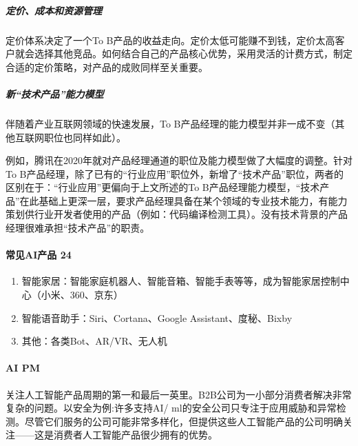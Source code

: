 \documentclass[letterpaper,11pt,english]{sphinxmanual}
\begin{document}
\subparagraph{定价、成本和资源管理}
\label{\detokenize{chapter_introduction/2B:id37}}
定价体系决定了一个To
B产品的收益走向。定价太低可能赚不到钱，定价太高客户就会选择其他竞品。如何结合自己的产品核心优势，采用灵活的计费方式，制定合适的定价策略，对产品的成败同样至关重要。


\subparagraph{新“技术产品”能力模型}
\label{\detokenize{chapter_introduction/2B:id38}}
伴随着产业互联网领域的快速发展，To
B产品经理的能力模型并非一成不变（其他互联网职位也同样如此）。

例如，腾讯在2020年就对产品经理通道的职位及能力模型做了大幅度的调整。针对To
B产品经理，除了已有的“行业应用”职位外，新增了“技术产品”职位，两者的区别在于：“行业应用”更偏向于上文所述的To
B产品经理能力模型，“技术产品”在此基础上更深一层，要求产品经理具备在某个领域的专业技术能力，有能力策划供行业开发者使用的产品（例如：代码编译检测工具）。没有技术背景的产品经理很难承担“技术产品”的职责。


\paragraph{常见AI产品 24\sphinxfootnotemark[64]}
\label{\detokenize{chapter_introduction/2B:ai-24}}%
\begin{footnotetext}[64]\sphinxAtStartFootnote
{}
%
\end{footnotetext}\ignorespaces \begin{enumerate}
%
\item {} 
智能家居：智能家庭机器人、智能音箱、智能手表等等，成为智能家居控制中心（小米、360、京东）

\item {} 
智能语音助手：Siri、Cortana、Google Assistant、度秘、Bixby

\item {} 
其他：各类Bot、AR/VR、无人机

\end{enumerate}


\paragraph{AI PM}
\label{\detokenize{chapter_introduction/2B:ai-pm}}
关注人工智能产品周期的第一和最后一英里。B2B公司为一小部分消费者解决非常复杂的问题。以安全为例:许多支持AI/
ml的安全公司只专注于应用威胁和异常检测。尽管它们服务的公司可能非常多样化，但提供这些人工智能产品的公司明确关注——这是消费者人工智能产品很少拥有的优势。
\end{document}
